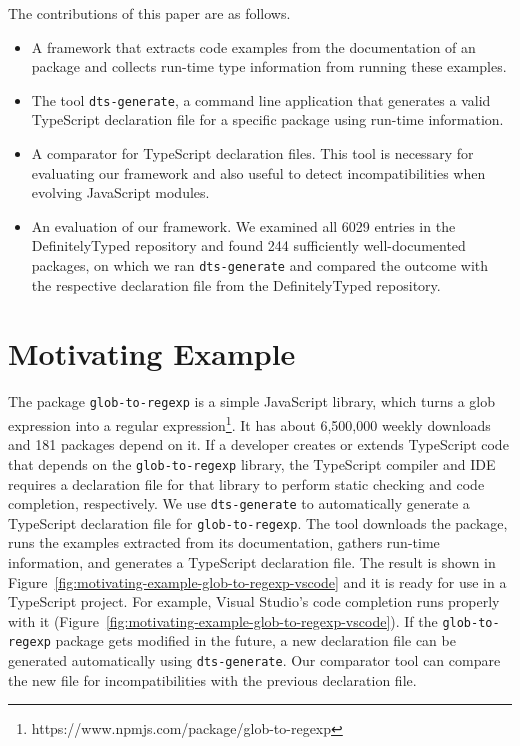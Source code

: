 \documentclass[a4paper,english,cleveref, autoref]{lipics-v2019}
\newcommand{\figref}[1]{Figure~\ref{#1}}
\begin{document}
The contributions of this paper are as follows.
\begin{itemize}
\item A framework that extracts code examples from the
  documentation of an \NPM{} package and collects run-time type
  information from running these examples.

\item The tool \texttt{dts-generate}, a command line
  application that generates a valid TypeScript declaration file for a
  specific \NPM{} package using run-time information.

\item A comparator for TypeScript declaration files. This tool is
  necessary for evaluating our framework and also useful to detect
  incompatibilities when evolving JavaScript modules.
\item An evaluation of our framework. We examined all 6029 entries in
  the DefinitelyTyped repository and found 244 sufficiently
  well-documented \NPM{} packages, on which we ran \texttt{dts-generate}
  and compared the outcome with the respective declaration file from the
  DefinitelyTyped repository. 

\end{itemize}

\section{Motivating Example}
\label{sec:motivating-example}
The \NPM{} package \texttt{glob-to-regexp} is a simple JavaScript library, which turns a glob expression into a regular expression\footnote{https://www.npmjs.com/package/glob-to-regexp}. It
has about 6,500,000 weekly downloads and 181 \NPM{} packages depend on it. If
a developer creates or extends TypeScript code that depends on the
\texttt{glob-to-regexp} library, the TypeScript
compiler and IDE requires a declaration file for that library to
perform static checking and code completion, respectively. We 
use \texttt{dts-generate} to automatically generate a TypeScript
declaration file for \texttt{glob-to-regexp}. The tool downloads the \NPM{} 
package, runs the examples extracted from its documentation, gathers
run-time information, and generates a TypeScript declaration
file. The result is 
shown in \figref{fig:motivating-example-glob-to-regexp-vscode} and it is
ready for use in a TypeScript project. For example,  Visual Studio's
code completion runs properly with it
(\figref{fig:motivating-example-glob-to-regexp-vscode}). If the
\texttt{glob-to-regexp} package gets modified in the future, a new declaration
file can be generated automatically using
\texttt{dts-generate}. Our comparator tool can compare the new file
for incompatibilities with the previous declaration file.
\end{document}
